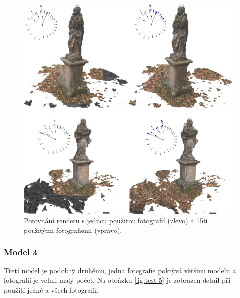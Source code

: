 \documentclass[11pt,twoside,a4paper]{book}
\begin{document}
\begin{figure}[h!]
\begin{center}
\includegraphics[width=\textwidth]{figures/test-4}
\caption{Porovnání renderu s jednou použitou fotografií (vlevo) a 15ti použitými fotografiemi (vpravo).}
\label{fig:test-4}
\end{center}
\end{figure}

\subsubsection*{Model 3}

Třetí model je podobný druhému, jedna fotografie pokrývá většinu modelu a fotografií je velmi malý počet. Na obrázku \ref{fig:test-5} je zobrazen detail při použití jedné a všech fotografií.
\end{document}
